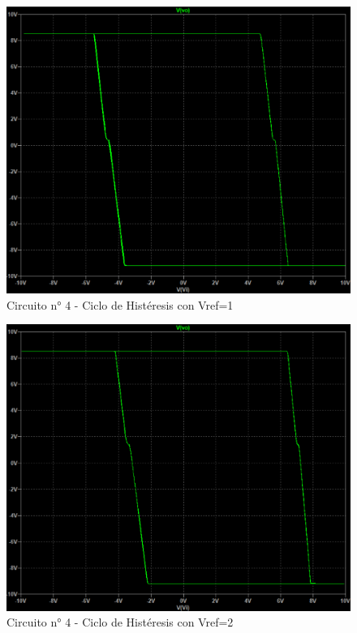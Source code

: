 \begin{figure}[H]
    \centering
    \includegraphics[width=1.0\linewidth]{Secciones/Circuito4/Circuito 4 - Vref1.png}
    \caption{Circuito n° 4 - Ciclo de Histéresis con Vref=1}
    \label{fig:Vref1}
\end{figure}
\begin{figure}[H]
    \centering
    \includegraphics[width=1.0\linewidth]{Secciones/Circuito4/Circuito 4 - Vref2.png}
    \caption{Circuito n° 4 - Ciclo de Histéresis con Vref=2}
    \label{fig:Vref2}
\end{figure}
